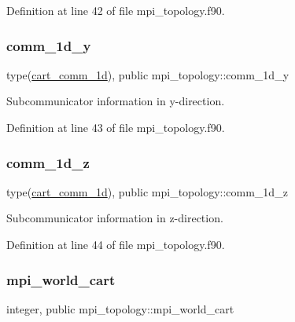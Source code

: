 Definition at line 42 of file mpi\+\_\+topology.\+f90.

\mbox{\label{namespacempi__topology_ad48a88602b9b9950200733823f95b5d0}} 
\subsubsection{\texorpdfstring{comm\_1d\_y}{comm\_1d\_y}}
{\footnotesize\ttfamily type(\mbox{\hyperlink{structmpi__topology_1_1cart__comm__1d}{cart\+\_\+comm\+\_\+1d}}), public mpi\+\_\+topology\+::comm\+\_\+1d\+\_\+y}



Subcommunicator information in y-\/direction. 



Definition at line 43 of file mpi\+\_\+topology.\+f90.

\mbox{\label{namespacempi__topology_aed5c66dd4697b116c53db4613ad802ce}} 
\subsubsection{\texorpdfstring{comm\_1d\_z}{comm\_1d\_z}}
{\footnotesize\ttfamily type(\mbox{\hyperlink{structmpi__topology_1_1cart__comm__1d}{cart\+\_\+comm\+\_\+1d}}), public mpi\+\_\+topology\+::comm\+\_\+1d\+\_\+z}



Subcommunicator information in z-\/direction. 



Definition at line 44 of file mpi\+\_\+topology.\+f90.

\mbox{\label{namespacempi__topology_a2b10bc780ba4b14ea773c36f3e489a94}} 
\subsubsection{\texorpdfstring{mpi\_world\_cart}{mpi\_world\_cart}}
{\footnotesize\ttfamily integer, public mpi\+\_\+topology\+::mpi\+\_\+world\+\_\+cart}




